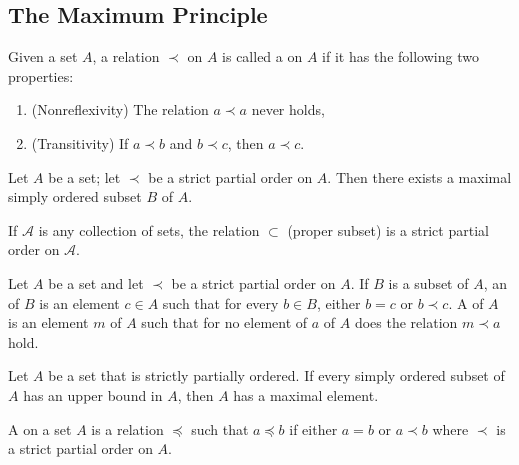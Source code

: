 \documentclass[12pt, a4paper, oneside, openright, titlepage]{book}
\begin{document}
\begin{appendices}
    \section{The Maximum Principle}

    \begin{defn}
        Given a set $A$, a relation $\prec$ on $A$ is called a  on $A$ if it has the following two properties: \begin{enumerate}
            \item (Nonreflexivity) The relation $a \prec a$ never holds,
            \item (Transitivity) If $a \prec b$ and $b \prec c$, then $a \prec c$.
        \end{enumerate}
    \end{defn}

    \begin{namthm}
        Let $A$ be a set; let $\prec$ be a strict partial order on $A$. Then there exists a maximal simply ordered subset $B$ of $A$.
    \end{namthm}


    \begin{eg}
        If $\mathscr{A}$ is any collection of sets, the relation $\subset$ (proper subset) is a strict partial order on $\mathscr{A}$. 
    \end{eg}

    \begin{defn}
        Let $A$ be a set and let $\prec$ be a strict partial order on $A$. If $B$ is a subset of $A$, an  of $B$ is an element $c \in A$ such that for every $b \in B$, either $b = c$ or $b \prec c$. A  of $A$ is an element $m$ of $A$ such that for no element of $a$ of $A$ does the relation $m \prec a$ hold.
    \end{defn}

    \begin{cust}
        Let $A$ be a set that is strictly partially ordered. If every simply ordered subset of $A$ has an upper bound in $A$, then $A$ has a maximal element.
    \end{cust}

    \begin{rmk}
        A  on a set $A$ is a relation $\preceq$ such that $a \preceq b$ if either $a = b$ or $a \prec b$ where $\prec$ is a strict partial order on $A$.
    \end{rmk}






\end{appendices}
\end{document}
